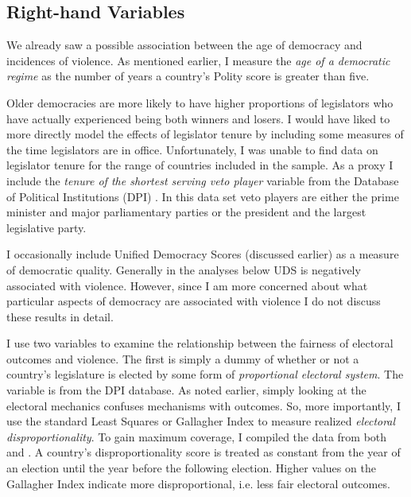 \documentclass[a4paper]{article}\usepackage{graphicx, color}
\begin{document}
{%
\subsection{Right-hand Variables}

We already saw a possible association between the age of democracy and incidences of violence. As mentioned earlier, I measure the {\emph{age of a democratic regime}} as the number of years a country's Polity score is greater than five.

Older democracies are more likely to have higher proportions of legislators who have actually experienced being both winners and losers. I would have liked to more directly model the effects of legislator tenure by including some measures of the time legislators are in office. Unfortunately, I was unable to find data on legislator tenure for the range of countries included in the sample. As a proxy I include the {\emph{tenure of the shortest serving veto player}} variable from the Database of Political Institutions (DPI) \citep[updated to 2010]{DPI2001}. In this data set veto players are either the prime minister and major parliamentary parties or the president and the largest legislative party.

I occasionally include Unified Democracy Scores (discussed earlier) as a measure of democratic quality. Generally in the analyses below UDS is negatively associated with violence. However, since I am more concerned about what particular aspects of democracy are associated with violence I do not discuss these results in detail.

I use two variables to examine the relationship between the fairness of electoral outcomes and violence. The first is simply a dummy of whether or not a country's legislature is elected by some form of {\emph{proportional electoral system}}. The variable is from the DPI database. As noted earlier, simply looking at the electoral mechanics confuses mechanisms with outcomes. So, more importantly, I use the standard Least Squares or Gallagher Index \citep[see][]{Gallagher1991} to measure realized {\emph{electoral disproportionality}}. To gain maximum coverage, I compiled the data from both \cite{Gallagher2012} and \cite{Carey2011}. A country's disproportionality score is treated as constant from the year of an election until the year before the following election. Higher values on the Gallagher Index indicate more disproportional, i.e. less fair electoral outcomes.

}
\end{document}
